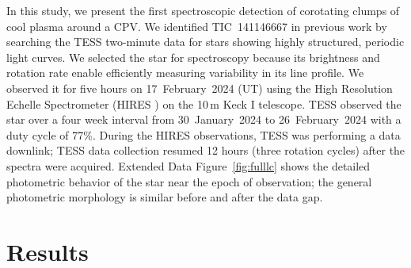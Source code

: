 \documentclass{nature3}
\begin{document}
In this study, we present the first spectroscopic detection of
corotating clumps of cool plasma around a CPV.  We identified
TIC~141146667 in previous work \cite{Bouma2024} by searching the TESS
two-minute data \cite{Ricker2015} for stars showing highly structured,
periodic light curves.  We selected the star for spectroscopy because
its brightness and rotation rate enable efficiently measuring
variability in its line profile.  We observed it for five hours on
17~February~2024 (UT) using the High Resolution Echelle Spectrometer
(HIRES \cite{vogt_hires_1994}) on the 10\,m Keck I telescope.  TESS
observed the star over a four week interval from 30~January~2024 to
26~February~2024 with a duty cycle of 77\%.  During the HIRES
observations, TESS was performing a data downlink; TESS data
collection resumed 12 hours (three rotation cycles) after the spectra
were acquired.  Extended Data Figure~\ref{fig:fulllc} shows the
detailed photometric behavior of the star near the epoch of
observation; the general photometric morphology is similar before and
after the data gap.


\section{Results}
\end{document}

